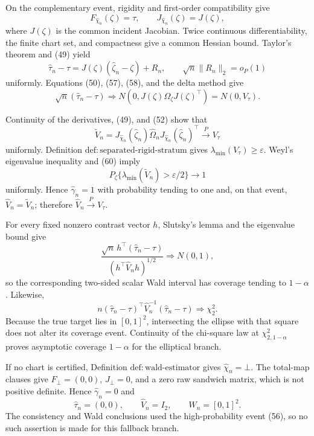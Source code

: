 On the complementary event, rigidity and first-order compatibility give
\[
 F_{\widehat\chi_n}(\zeta)=\tau,
 \qquad
 J_{\widehat\chi_n}(\zeta)=J(\zeta),                     \tag{57}
\]
where \(J(\zeta)\) is the common incident Jacobian.  Twice continuous differentiability, the finite chart set, and compactness give a common Hessian bound.  Taylor's theorem and (49) yield
\[
 \widehat\tau_n-\tau
 =J(\zeta)(\widehat\zeta_n-\zeta)+R_n,
 \qquad
 \sqrt n\|R_n\|_2=o_P(1)                                \tag{58}
\]
uniformly.  Equations (50), (57), (58), and the delta method give
\[
 \sqrt n(\widehat\tau_n-\tau)
 \Rightarrow
 N\!\left(0,J(\zeta)\Omega_{\zeta}J(\zeta)^{\top}\right)
 =N(0,V_{\tau}).                                          \tag{59}
\]

Continuity of the derivatives, (49), and (52) show that
\[
 \widetilde V_n=
 J_{\widehat\chi_n}(\widehat\zeta_n)\widehat\Omega_n
 J_{\widehat\chi_n}(\widehat\zeta_n)^{\top}
 \xrightarrow{P}V_{\tau}                                 \tag{60}
\]
uniformly.  Definition \(\mathrm{def{:}separated\text{-}rigid\text{-}stratum}\) gives \(\lambda_{\min}(V_{\tau})\ge\varepsilon\).  Weyl's eigenvalue inequality and (60) imply
\[
 P_{\zeta}\{\lambda_{\min}(\widetilde V_n)>\varepsilon/2\}
 \longrightarrow1                                        \tag{61}
\]
uniformly.  Hence \(\widehat\gamma_n=1\) with probability tending to one and, on that event, \(\widehat V_n=\widetilde V_n\); therefore \(\widehat V_n\xrightarrow{P}V_{\tau}\).

For every fixed nonzero contrast vector \(h\), Slutsky's lemma and the eigenvalue bound give
\[
 \frac{\sqrt n\,h^{\top}(\widehat\tau_n-\tau)}
      {(h^{\top}\widehat V_nh)^{1/2}}
 \Rightarrow N(0,1),                                      \tag{62}
\]
so the corresponding two-sided scalar Wald interval has coverage tending to \(1-\alpha\).  Likewise,
\[
 n(\widehat\tau_n-\tau)^{\top}\widehat V_n^{-1}
   (\widehat\tau_n-\tau)
 \Rightarrow\chi^2_2.                                    \tag{63}
\]
Because the true target lies in \([0,1]^2\), intersecting the ellipse with that square does not alter its coverage event.  Continuity of the chi-square law at \(\chi^2_{2,1-\alpha}\) proves asymptotic coverage \(1-\alpha\) for the elliptical branch.

If no chart is certified, Definition \(\mathrm{def{:}wald\text{-}estimator}\) gives \(\widehat\chi_n=\bot\).  The total-map clauses give \(F_{\bot}=(0,0)\), \(J_{\bot}=0\), and a zero raw sandwich matrix, which is not positive definite.  Hence \(\widehat\gamma_n=0\) and
\[
 \widehat\tau_n=(0,0),\qquad
 \widehat V_n=I_2,\qquad
 W_n=[0,1]^2.                                              \tag{64}
\]
The consistency and Wald conclusions used the high-probability event (56), so no such assertion is made for this fallback branch.


